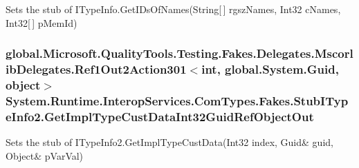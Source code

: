 Sets the stub of I\-Type\-Info.\-Get\-I\-Ds\-Of\-Names(\-String\mbox{[}$\,$\mbox{]} rgsz\-Names, Int32 c\-Names, Int32\mbox{[}$\,$\mbox{]} p\-Mem\-Id)

\hypertarget{class_system_1_1_runtime_1_1_interop_services_1_1_com_types_1_1_fakes_1_1_stub_i_type_info2_abc4bfd7bf5e4bab8af5b17a0a77c00da}{
\subsubsection[{Get\-Impl\-Type\-Cust\-Data\-Int32\-Guid\-Ref\-Object\-Out}]{\setlength{\rightskip}{0pt plus 5cm}global.\-Microsoft.\-Quality\-Tools.\-Testing.\-Fakes.\-Delegates.\-Mscorlib\-Delegates.\-Ref1\-Out2\-Action301$<$int, global.\-System.\-Guid, object$>$ System.\-Runtime.\-Interop\-Services.\-Com\-Types.\-Fakes.\-Stub\-I\-Type\-Info2.\-Get\-Impl\-Type\-Cust\-Data\-Int32\-Guid\-Ref\-Object\-Out}}\label{class_system_1_1_runtime_1_1_interop_services_1_1_com_types_1_1_fakes_1_1_stub_i_type_info2_abc4bfd7bf5e4bab8af5b17a0a77c00da}


Sets the stub of I\-Type\-Info2.\-Get\-Impl\-Type\-Cust\-Data(Int32 index, Guid\& guid, Object\& p\-Var\-Val)

